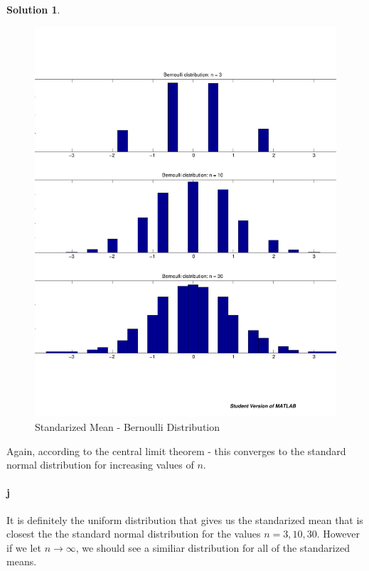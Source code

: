 \documentclass[a4paper, fleqn]{amsart}
\theoremstyle{definition}
\newtheorem{sltn}{Solution}
\begin{document}
\begin{sltn}
\begin{figure}[p]
  \centering
  \includegraphics[scale=0.4]{bernoulli_mean}
  \caption{Standarized Mean - Bernoulli Distribution}
  \label{fig:bernoulli_mean}
\end{figure}

Again, according to the central limit theorem - this converges to the standard
normal distribution for increasing values of $n$. 

\paragraph{j}

It is definitely the uniform distribution that gives us the standarized mean
that is closest the the standard normal distribution for the values $n = 3, 10,
30$. However if we let $n \rightarrow \infty$, we should see a similiar
distribution for all of the standarized means.
\end{sltn}
\end{document}
